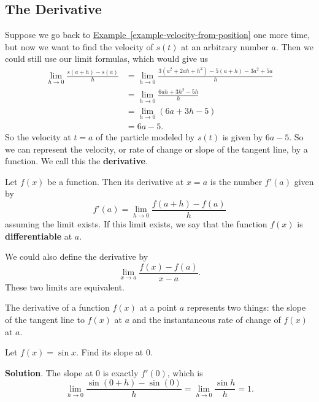 \documentclass[10pt,]{book}
\newcommand{\terminology}[1]{\textbf{#1}}
\theoremstyle{ptxplainnotitle}
\theoremstyle{ptxplaintitle}
\theoremstyle{ptxplainnotitle}
\theoremstyle{ptxplaintitle}
\theoremstyle{ptxplainnotitle}
\theoremstyle{ptxplaintitle}
\theoremstyle{ptxdefinitionnotitle}
\theoremstyle{ptxdefinitiontitle}
\theoremstyle{ptxdefinitionnotitle}
\theoremstyle{ptxdefinitiontitle}
\theoremstyle{ptxdefinitionnotitle}
\theoremstyle{ptxdefinitiontitle}
\theoremstyle{ptxdefinitionnotitle}
\theoremstyle{ptxdefinitiontitle}
\theoremstyle{ptxdefinitionnotitle}
\theoremstyle{ptxdefinitiontitle}
\numberwithin{equation}{section}
\begin{document}
\subsection[{The Derivative}]{The Derivative}\label{subsection-the-derivative}
\hypertarget{p-91}{}%
Suppose we go back to \hyperref[example-velocity-from-position]{Example~\ref{example-velocity-from-position}} one more time, but now we want to find the velocity of \(s(t)\) at an arbitrary number \(a\). Then we could still use our limit formulas, which would give us%
%
\begin{align*}
\lim_{h\to0}\frac{s(a+h)-s(a)}{h} & = \lim_{h\to0}\frac{3(a^{2}+2ah+h^{2})-5(a+h) - 3a^{2} + 5a}{h} \\
& = \lim_{h\to0}\frac{6ah+3h^{2} - 5h}{h} \\
& = \lim_{h\to0}(6a+3h-5) \\
& = 6a-5. 
\end{align*}
\hypertarget{p-92}{}%
So the velocity at \(t=a\) of the particle modeled by \(s(t)\) is given by \(6a-5\). So we can represent the velocity, or rate of change or slope of the tangent line, by a function. We call this the \terminology{derivative}.%
\begin{definition}\label{definition-definition-of-the-derivative}
\hypertarget{p-93}{}%
Let \(f(x)\) be a function. Then its derivative at \(x=a\) is the number \(f'(a)\) given by%
\begin{equation*}
f'(a) = \lim_{h\to0}\frac{f(a+h)-f(a)}{h}
\end{equation*}
assuming the limit exists. If this limit exists, we say that the function \(f(x)\) is \terminology{differentiable} at \(a\).%
\end{definition}
\begin{aside}{}\label{aside-4}
\hypertarget{p-94}{}%
We could also define the derivative by%
\begin{equation*}
\lim_{x\to a}\frac{f(x)-f(a)}{x-a}.
\end{equation*}
These two limits are equivalent.%
\end{aside}
\hypertarget{p-95}{}%
The derivative of a function \(f(x)\) at a point \(a\) represents two things: the slope of the tangent line to \(f(x)\) at \(a\) and the instantaneous rate of change of \(f(x)\) at \(a\).%
\begin{example}\label{example-slope-of-the-sine-function}
\hypertarget{p-96}{}%
Let \(f(x) = \sin x\). Find its slope at \(0\).%
\par\smallskip%
\noindent\textbf{Solution}.\hypertarget{solution-20}{}\quad%
\hypertarget{p-97}{}%
The slope at \(0\) is exactly \(f'(0)\), which is%
\begin{equation*}
\lim_{h\to0}\frac{\sin(0+h)-\sin(0)}{h} = \lim_{h\to0}\frac{\sin h}{h} = 1.
\end{equation*}
%
\end{example}
\end{document}
